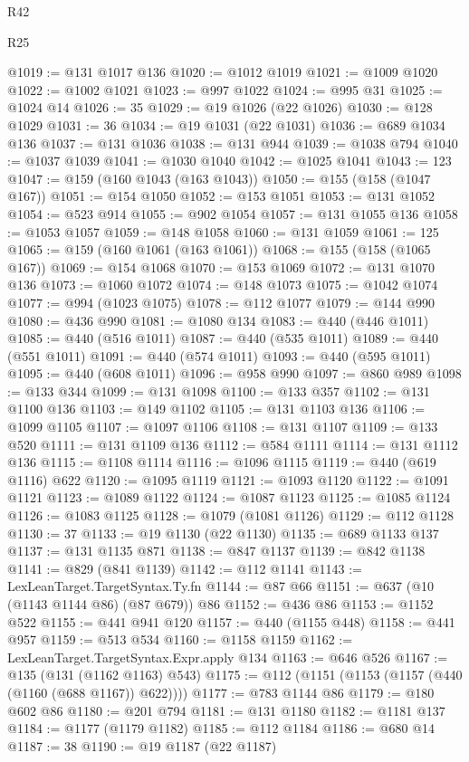 \begin{lexlean}{R42}
\begin{lexlean}{R25}
\begin{coremodule}
{{{{{{{{{{{{{{{{{{{{{{{{{{{{{{{{{{{{{{{{{{{{{{{{{{{{{{{{{{{{{{{{{{{{{{{{{{{{{{{{{{{{{{{{{{{{{{{{{{{{{{{{{{{{{{{{{{{{{{{{{{{{{{{{{{{{{{{{{{{{{{{{{{{{{{{{{{{{{{{{{{{{{{{{{{{{{{{{{{{{{{{{{{{{{{{{{{{{{{{@1019 := @131 @1017 @136
@1020 := @1012 @1019
@1021 := @1009 @1020
@1022 := @1002 @1021
@1023 := @997 @1022
@1024 := @995 @31
@1025 := @1024 @14
@1026 := 35
@1029 := @19 @1026 (@22 @1026)
@1030 := @128 @1029
@1031 := 36
@1034 := @19 @1031 (@22 @1031)
@1036 := @689 @1034 @136
@1037 := @131 @1036
@1038 := @131 @944
@1039 := @1038 @794
@1040 := @1037 @1039
@1041 := @1030 @1040
@1042 := @1025 @1041
@1043 := 123
@1047 := @159 (@160 @1043 (@163 @1043))
@1050 := @155 (@158 (@1047 @167))
@1051 := @154 @1050
@1052 := @153 @1051
@1053 := @131 @1052
@1054 := @523 @914
@1055 := @902 @1054
@1057 := @131 @1055 @136
@1058 := @1053 @1057
@1059 := @148 @1058
@1060 := @131 @1059
@1061 := 125
@1065 := @159 (@160 @1061 (@163 @1061))
@1068 := @155 (@158 (@1065 @167))
@1069 := @154 @1068
@1070 := @153 @1069
@1072 := @131 @1070 @136
@1073 := @1060 @1072
@1074 := @148 @1073
@1075 := @1042 @1074
@1077 := @994 (@1023 @1075)
@1078 := @112 @1077
@1079 := @144 @990
@1080 := @436 @990
@1081 := @1080 @134
@1083 := @440 (@446 @1011)
@1085 := @440 (@516 @1011)
@1087 := @440 (@535 @1011)
@1089 := @440 (@551 @1011)
@1091 := @440 (@574 @1011)
@1093 := @440 (@595 @1011)
@1095 := @440 (@608 @1011)
@1096 := @958 @990
@1097 := @860 @989
@1098 := @133 @344
@1099 := @131 @1098
@1100 := @133 @357
@1102 := @131 @1100 @136
@1103 := @149 @1102
@1105 := @131 @1103 @136
@1106 := @1099 @1105
@1107 := @1097 @1106
@1108 := @131 @1107
@1109 := @133 @520
@1111 := @131 @1109 @136
@1112 := @584 @1111
@1114 := @131 @1112 @136
@1115 := @1108 @1114
@1116 := @1096 @1115
@1119 := @440 (@619 @1116) @622
@1120 := @1095 @1119
@1121 := @1093 @1120
@1122 := @1091 @1121
@1123 := @1089 @1122
@1124 := @1087 @1123
@1125 := @1085 @1124
@1126 := @1083 @1125
@1128 := @1079 (@1081 @1126)
@1129 := @112 @1128
@1130 := 37
@1133 := @19 @1130 (@22 @1130)
@1135 := @689 @1133 @137
@1137 := @131 @1135 @871
@1138 := @847 @1137
@1139 := @842 @1138
@1141 := @829 (@841 @1139)
@1142 := @112 @1141
@1143 := LexLeanTarget.TargetSyntax.Ty.fn
@1144 := @87 @66
@1151 := @637 (@10 (@1143 @1144 @86) (@87 @679)) @86
@1152 := @436 @86
@1153 := @1152 @522
@1155 := @441 @941 @120
@1157 := @440 (@1155 @448)
@1158 := @441 @957
@1159 := @513 @534
@1160 := @1158 @1159
@1162 := LexLeanTarget.TargetSyntax.Expr.apply @134
@1163 := @646 @526
@1167 := @135 (@131 (@1162 @1163) @543)
@1175 := @112 (@1151 (@1153 (@1157 (@440 (@1160 (@688 @1167)) @622))))
@1177 := @783 @1144 @86
@1179 := @180 @602 @86
@1180 := @201 @794
@1181 := @131 @1180
@1182 := @1181 @137
@1184 := @1177 (@1179 @1182)
@1185 := @112 @1184
@1186 := @680 @14
@1187 := 38
@1190 := @19 @1187 (@22 @1187)
}}}}}}}}}}}}}}}}}}}}}}}}}}}}}}}}}}}}}}}}}}}}}}}}}}}}}}}}}}}}}}}}}}}}}}}}}}}}}}}}}}}}}}}}}}}}}}}}}}}}}}}}}}}}}}}}}}}}}}}}}}}}}}}}}}}}}}}}}}}}}}}}}}}}}}}}}}}}}}}}}}}}}}}}}}}}}}}}}}}}}}}}}}}}}}}}}}}}}}}
\end{coremodule}
\end{lexlean}
\end{lexlean}

